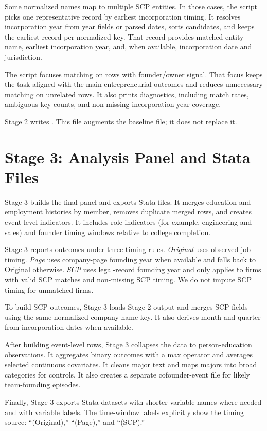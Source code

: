 \documentclass[12pt]{article}
\begin{document}
Some normalized names map to multiple SCP entities. In those cases, the script picks one representative record by earliest incorporation timing. It resolves incorporation year from year fields or parsed dates, sorts candidates, and keeps the earliest record per normalized key. That record provides matched entity name, earliest incorporation year, and, when available, incorporation date and jurisdiction.

The script focuses matching on rows with founder/owner signal. That focus keeps the task aligned with the main entrepreneurial outcomes and reduces unnecessary matching on unrelated rows. It also prints diagnostics, including match rates, ambiguous key counts, and non-missing incorporation-year coverage.

Stage 2 writes . This file augments the baseline file; it does not replace it.

\section{Stage 3: Analysis Panel and Stata Files}

Stage 3 builds the final panel and exports Stata files. It merges education and employment histories by member, removes duplicate merged rows, and creates event-level indicators. It includes role indicators (for example, engineering and sales) and founder timing windows relative to college completion.

Stage 3 reports outcomes under three timing rules. \emph{Original} uses observed job timing. \emph{Page} uses company-page founding year when available and falls back to Original otherwise. \emph{SCP} uses legal-record founding year and only applies to firms with valid SCP matches and non-missing SCP timing. We do not impute SCP timing for unmatched firms.

To build SCP outcomes, Stage 3 loads Stage 2 output and merges SCP fields using the same normalized company-name key. It also derives month and quarter from incorporation dates when available.

After building event-level rows, Stage 3 collapses the data to person-education observations. It aggregates binary outcomes with a max operator and averages selected continuous covariates. It cleans major text and maps majors into broad categories for controls. It also creates a separate cofounder-event file for likely team-founding episodes.

Finally, Stage 3 exports Stata datasets with shorter variable names where needed and with variable labels. The time-window labels explicitly show the timing source: ``(Original),'' ``(Page),'' and ``(SCP).''
\end{document}

